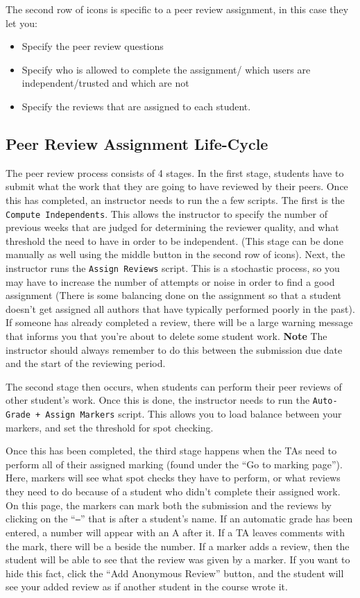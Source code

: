 \documentclass[11pt,letterpaper,oneside]{article}
\begin{document}
The second row of icons is specific to a peer review assignment,  in this case they let you:
\begin{itemize}
  \item Specify the peer review questions
  \item Specify who is allowed to complete the assignment/ which users are independent/trusted and which are not
  \item Specify the reviews that are assigned to each student.
\end{itemize}

\subsection{Peer Review Assignment Life-Cycle}

The peer review process consists of 4 stages. In the first stage, students have to submit what the work that they are going to have reviewed by their peers. Once this has completed, an instructor needs to run the a few scripts. The first is the \texttt{Compute Independents}. This allows the instructor to specify the number of previous weeks that are judged for determining the reviewer quality,  and what threshold the need to have in order to be independent. (This stage can be done manually as well using the middle button in the second row of icons). Next,  the instructor runs the \texttt{Assign Reviews} script. This is a stochastic process, so you may have to increase the number of attempts or noise in order to find a good assignment (There is some balancing done on the assignment so that a student doesn't get assigned all authors that have typically performed poorly in the past). If someone has already completed a review,  there will be a large warning message that informs you that you're about to delete some student work. \textbf{Note} The instructor should always remember to do this between the submission due date and the start of the reviewing period. 

The second stage then occurs,  when students can perform their peer reviews of other student's work. Once this is done,  the instructor needs to run the \texttt{Auto-Grade + Assign Markers} script. This allows you to load balance between your markers,  and set the threshold for spot checking. 

Once this has been completed,  the third stage happens when the TAs need to perform all of their assigned marking (found under the ``Go to marking page''). Here,  markers will see what spot checks they have to perform, or what reviews they need to do because of a student who didn't complete their assigned work. On this page,  the markers can mark both the submission and the reviews by clicking on the ``\texttt{--}'' that is after a student's name. If an automatic grade has been entered,  a number will appear with an A after it. If a TA leaves comments with the mark,  there will be a \textt{+} beside the number. If a marker adds a review,  then the student will be able to see that the review was given by a marker. If you want to hide this fact,  click the ``Add Anonymous Review'' button,  and the student will see your added review as if another student in the course wrote it.
\end{document}
